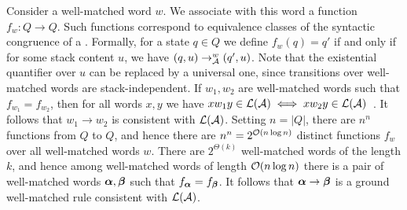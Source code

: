 Consider a well-matched word $w$. We associate with this word a function $f_w \colon Q \to Q$.
Such functions correspond to equivalence classes of the syntactic congruence of a \DFA.
Formally, for a state $q \in Q$ we define $f_w(q) = q'$ if and only if for some stack content $u$, we have $(q,u) \rightarrow_{\mathcal{A}}^{w} (q',u)$.
Note that the existential quantifier over $u$ can be replaced by a universal one, since transitions over well-matched words are stack-independent. 
If $w_1, w_2$ are well-matched words such that $f_{w_1} = f_{w_2}$, 
then for all words $x,y$ we have $x w_1 y \in \mathcal{L}(\mathcal{A}) \iff x w_2 y \in \mathcal{L}(\mathcal{A})$~\cite[Theorem~1]{alur2005congruences}.
It follows that $w_1 \to w_2$ is consistent with $\mathcal{L}(\mathcal{A})$. 
Setting $n = |Q|$, there are $n^n$ functions from $Q$ to $Q$, and hence there are $n^n = 2^{\mathcal{O}(n \log n)}$ distinct functions $f_w$ over all well-matched words $w$.
There are $2^{\Theta(k)}$ well-matched words of the length $k$, and hence among well-matched words of length $\mathcal{O}(n \log n)$ 
there is a pair of well-matched words $\boldsymbol{\alpha}, \boldsymbol{\beta}$ such that $f_{\boldsymbol{\alpha}} = f_{\boldsymbol{\beta}}$. 
It follows that $\boldsymbol{\alpha} \to \boldsymbol{\beta}$ is a ground well-matched rule consistent with $\mathcal{L}(\mathcal{A})$. 

